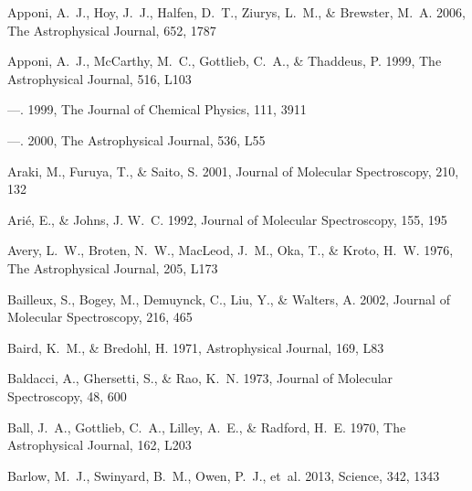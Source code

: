 \documentclass[twocolumn]{aastex631}
\begin{document}
\begin{thebibliography}{}
Apponi, A.~J., Hoy, J.~J., Halfen, D.~T., Ziurys, L.~M., \& Brewster, M.~A.
  2006, The Astrophysical Journal, 652, 1787

Apponi, A.~J., McCarthy, M.~C., Gottlieb, C.~A., \& Thaddeus, P.
  1999{}, The Astrophysical Journal, 516, L103

---. 1999{}, The Journal of Chemical Physics, 111, 3911

---. 2000, The Astrophysical Journal, 536, L55

Araki, M., Furuya, T., \& Saito, S. 2001, Journal of Molecular Spectroscopy,
  210, 132

Ari{\'e}, E., \& Johns, J. W.~C. 1992, Journal of Molecular Spectroscopy, 155,
  195

Avery, L.~W., Broten, N.~W., MacLeod, J.~M., Oka, T., \& Kroto, H.~W. 1976, The
  Astrophysical Journal, 205, L173

Bailleux, S., Bogey, M., Demuynck, C., Liu, Y., \& Walters, A. 2002, Journal of
  Molecular Spectroscopy, 216, 465

Baird, K.~M., \& Bredohl, H. 1971, Astrophysical Journal, 169, L83

Baldacci, A., Ghersetti, S., \& Rao, K.~N. 1973, Journal of Molecular
  Spectroscopy, 48, 600

Ball, J.~A., Gottlieb, C.~A., Lilley, A.~E., \& Radford, H.~E. 1970, The
  Astrophysical Journal, 162, L203

Barlow, M.~J., Swinyard, B.~M., Owen, P.~J., {et~al.} 2013, Science, 342, 1343


\end{thebibliography}
\end{document}
